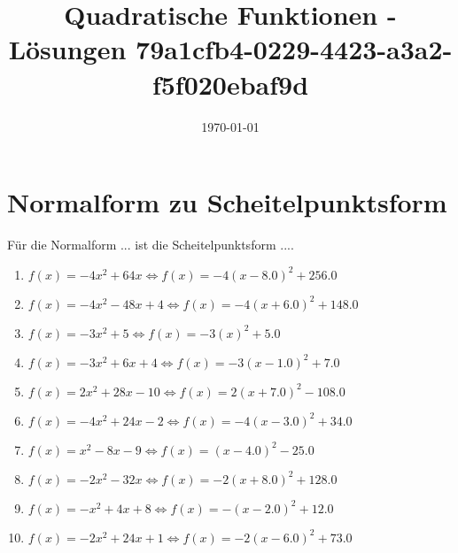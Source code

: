 \documentclass{article}%
\title{Quadratische Funktionen - Lösungen \newline 79a1cfb4-0229-4423-a3a2-f5f020ebaf9d}%
\date{\today}%
\begin{document}
%
\normalsize%
\maketitle%
\section{Normalform zu Scheitelpunktsform}%
\label{sec:NormalformzuScheitelpunktsform}%
Für die Normalform ... ist die Scheitelpunktsform ....%
\begin{enumerate}[label=\alph*)]%
\item%
\newline\vspace{0.5cm}$f(x)=-4x^2 + 64x\Leftrightarrow f(x)=-4(x-8.0)^2 +256.0$%
\item%
\newline\vspace{0.5cm}$f(x)=-4x^2 - 48x + 4\Leftrightarrow f(x)=-4(x+6.0)^2 +148.0$%
\item%
\newline\vspace{0.5cm}$f(x)=-3x^2 + 5\Leftrightarrow f(x)=-3(x)^2 +5.0$%
\item%
\newline\vspace{0.5cm}$f(x)=-3x^2 + 6x + 4\Leftrightarrow f(x)=-3(x-1.0)^2 +7.0$%
\item%
\newline\vspace{0.5cm}$f(x)=2x^2 + 28x - 10\Leftrightarrow f(x)=2(x+7.0)^2 -108.0$%
\item%
\newline\vspace{0.5cm}$f(x)=-4x^2 + 24x - 2\Leftrightarrow f(x)=-4(x-3.0)^2 +34.0$%
\item%
\newline\vspace{0.5cm}$f(x)=x^2 - 8x - 9\Leftrightarrow f(x)=(x-4.0)^2 -25.0$%
\item%
\newline\vspace{0.5cm}$f(x)=-2x^2 - 32x\Leftrightarrow f(x)=-2(x+8.0)^2 +128.0$%
\item%
\newline\vspace{0.5cm}$f(x)=-x^2 + 4x + 8\Leftrightarrow f(x)=-(x-2.0)^2 +12.0$%
\item%
\newline\vspace{0.5cm}$f(x)=-2x^2 + 24x + 1\Leftrightarrow f(x)=-2(x-6.0)^2 +73.0$%

\end{enumerate}
\end{document}
